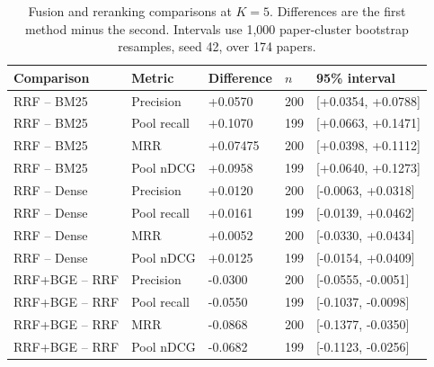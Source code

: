 \begin{table}[htbp]\centering\small
\caption{Fusion and reranking comparisons at $K=5$. Differences are the first method minus the second. Intervals use 1,000 paper-cluster bootstrap resamples, seed 42, over 174 papers.}\label{tab:p2-paired}
\begin{tabularx}{\linewidth}{YYYYY}\toprule
Comparison & Metric & Difference & $n$ & 95\% interval\\\midrule
RRF -- BM25 & Precision & +0.0570 & 200 & [+0.0354, +0.0788]\\
RRF -- BM25 & Pool recall & +0.1070 & 199 & [+0.0663, +0.1471]\\
RRF -- BM25 & MRR & +0.07475 & 200 & [+0.0398, +0.1112]\\
RRF -- BM25 & Pool nDCG & +0.0958 & 199 & [+0.0640, +0.1273]\\
RRF -- Dense & Precision & +0.0120 & 200 & [-0.0063, +0.0318]\\
RRF -- Dense & Pool recall & +0.0161 & 199 & [-0.0139, +0.0462]\\
RRF -- Dense & MRR & +0.0052 & 200 & [-0.0330, +0.0434]\\
RRF -- Dense & Pool nDCG & +0.0125 & 199 & [-0.0154, +0.0409]\\
RRF+BGE -- RRF & Precision & -0.0300 & 200 & [-0.0555, -0.0051]\\
RRF+BGE -- RRF & Pool recall & -0.0550 & 199 & [-0.1037, -0.0098]\\
RRF+BGE -- RRF & MRR & -0.0868 & 200 & [-0.1377, -0.0350]\\
RRF+BGE -- RRF & Pool nDCG & -0.0682 & 199 & [-0.1123, -0.0256]\\
\bottomrule\end{tabularx}\end{table}

